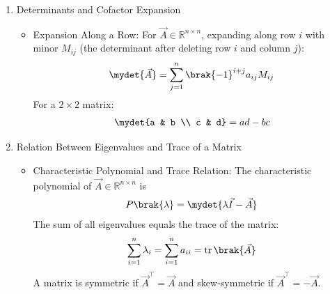 \begin{enumerate}[label=\thesubsection.\arabic*, ref=\thesubsection.\theenumi,itemsep=0pt]
\begin{itemize}
\item Homogeneous System and Zero Norm Property:
For $\vec{A} \in \mathbb{R}^{2 \times 3}$ with rank 2, the solution of $\vec{A}\vec{x} = \vec{0}$ is given by the cross product of its rows:
\begin{align}
\vec{x} = \kappa \brak{\vec{a}_1 \times \vec{a}_2}
\label{eq:cross} %
\end{align}
For any vector $\vec{v} \in \mathbb{R}^n$,
\begin{align} %
\norm{\vec{v}}^2 = \vec{v}^\top \vec{v} = \sum_i v_i^2 = 0 \iff \vec{v} = \vec{0}
\label{eq:zeronorm} %
\end{align}
\end{itemize}

\item Determinants and Cofactor Expansion %
\begin{itemize}
\item Expansion Along a Row:
For $\vec{A} \in \mathbb{R}^{n \times n}$, expanding along row $i$ with minor $M_{ij}$ (the determinant after deleting row $i$ and column $j$):
\begin{align}
\mydet{\vec{A}} = \sum_{j=1}^n \brak{-1}^{i+j} a_{ij} M_{ij}
\label{eq:detexp} %
\end{align}
For a $2 \times 2$ matrix:
\begin{align}
\mydet{a & b \\ c & d} = ad - bc
\label{eq:det2} %
\end{align}
\end{itemize}

\item Relation Between Eigenvalues and Trace of a Matrix
\begin{itemize}
\item Characteristic Polynomial and Trace Relation:
The characteristic polynomial of $\vec{A} \in \mathbb{R}^{n \times n}$ is
\begin{align} %
P\brak{\lambda} = \mydet{\lambda \vec{I} - \vec{A}}
\label{eq:charpoly} %
\end{align}
The sum of all eigenvalues equals the trace of the matrix:
\begin{align}
\sum_{i=1}^n \lambda_i = \sum_{i=1}^n a_{ii} = \operatorname{tr}\brak{\vec{A}}
\label{eq:trace} %
\end{align}
A matrix is symmetric if $\vec{A}^\top = \vec{A}$ and skew-symmetric if $\vec{A}^\top = -\vec{A}$.
\end{itemize}


\end{enumerate}
